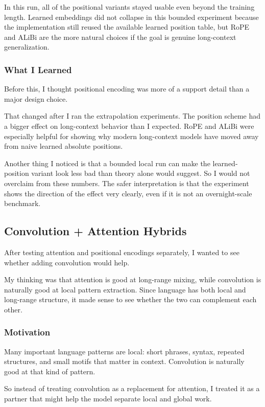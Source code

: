 \documentclass[11pt]{article}
\begin{document}
In this run, all of the positional variants stayed usable even beyond the training length. Learned embeddings did not collapse in this bounded experiment because the implementation still reused the available learned position table, but RoPE and ALiBi are the more natural choices if the goal is genuine long-context generalization.

\subsubsection{What I Learned}
Before this, I thought positional encoding was more of a support detail than a major design choice.

That changed after I ran the extrapolation experiments. The position scheme had a bigger effect on long-context behavior than I expected. RoPE and ALiBi were especially helpful for showing why modern long-context models have moved away from naive learned absolute positions.

Another thing I noticed is that a bounded local run can make the learned-position variant look less bad than theory alone would suggest. So I would not overclaim from these numbers. The safer interpretation is that the experiment shows the direction of the effect very clearly, even if it is not an overnight-scale benchmark.

\subsection{Convolution + Attention Hybrids}
After testing attention and positional encodings separately, I wanted to see whether adding convolution would help.

My thinking was that attention is good at long-range mixing, while convolution is naturally good at local pattern extraction. Since language has both local and long-range structure, it made sense to see whether the two can complement each other.

\subsubsection{Motivation}
Many important language patterns are local: short phrases, syntax, repeated structures, and small motifs that matter in context. Convolution is naturally good at that kind of pattern.

So instead of treating convolution as a replacement for attention, I treated it as a partner that might help the model separate local and global work.
\end{document}
